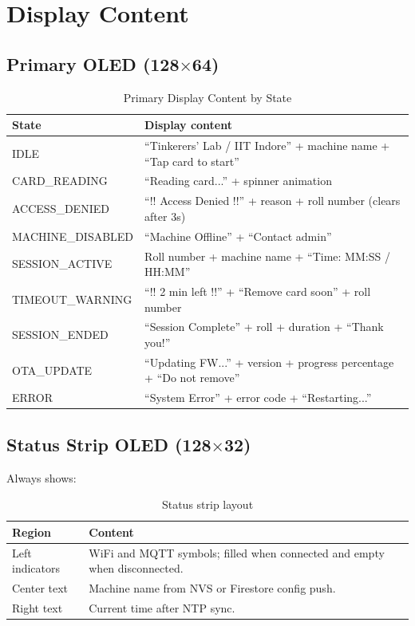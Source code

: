\section{Display Content}

\subsection{Primary OLED (128$\times$64)}

\begin{table}[H]
\centering
\caption{Primary Display Content by State}
\begin{tabular}{L{4cm}L{10.5cm}}
\toprule
\textbf{State} & \textbf{Display content} \\
\midrule
IDLE & ``Tinkerers' Lab / IIT Indore'' + machine name + ``Tap card to start'' \\
CARD\_READING & ``Reading card...'' + spinner animation \\
ACCESS\_DENIED & ``!! Access Denied !!'' + reason + roll number (clears after 3s) \\
MACHINE\_DISABLED & ``Machine Offline'' + ``Contact admin'' \\
SESSION\_ACTIVE & Roll number + machine name + ``Time: MM:SS / HH:MM'' \\
TIMEOUT\_WARNING & ``!! 2 min left !!'' + ``Remove card soon'' + roll number \\
SESSION\_ENDED & ``Session Complete'' + roll + duration + ``Thank you!'' \\
OTA\_UPDATE & ``Updating FW...'' + version + progress percentage + ``Do not remove'' \\
ERROR & ``System Error'' + error code + ``Restarting...'' \\
\bottomrule
\end{tabular}
\end{table}

\subsection{Status Strip OLED (128$\times$32)}

Always shows:
\begin{table}[H]
\centering
\caption{Status strip layout}
\begin{tabular}{L{4cm}L{10cm}}
\toprule
\textbf{Region} & \textbf{Content} \\
\midrule
Left indicators & WiFi and MQTT symbols; filled when connected and empty when disconnected. \\
Center text & Machine name from NVS or Firestore config push. \\
Right text & Current time after NTP sync. \\
\bottomrule
\end{tabular}
\end{table}

